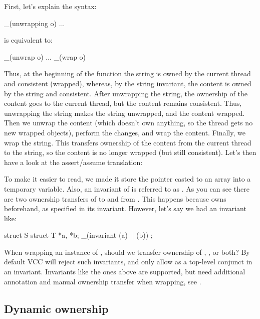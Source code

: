 
\noindent
First, let's explain the syntax:
\begin{VCC}
_(unwrapping o) { ... }
\end{VCC}
is equivalent to:
\begin{VCC}
_(unwrap o) { ... } _(wrap o)
\end{VCC}
Thus, at the beginning of the function the string is owned by the current thread and consistent (\ie wrapped),
whereas, by the string invariant, the content is owned by the string and consistent.
After unwrapping the string, the ownership of the content goes to the current thread,
but the content remains consistent.
Thus, unwrapping the string makes the string unwrapped, and the content wrapped.
Then we unwrap the content (which doesn't own anything, so the thread gets no new wrapped objects), perform the changes,
and wrap the content.
Finally, we wrap the string.
This transfers ownership of the content from the current thread to the string, so the content is no longer wrapped (but still consistent).
Let's then have a look at the assert/assume translation:


\noindent
To make it easier to read, we made it store the  pointer
casted to an array into a temporary variable.
Also, an invariant of  is referred to as .
As you can see there are two ownership transfers
of  to and from \vcc{\me}.
This happens because  owns  beforehand,
as specified in its invariant.
However, let's say we had an invariant like:
\begin{VCC}
struct S {
  struct T *a, *b;
  _(invariant \mine(a) || \mine(b))
};
\end{VCC}
When wrapping an instance of , should we transfer ownership of , , or both?
By default VCC will reject such invariants, and only allow 
as a top-level conjunct in an invariant.
Invariants like the ones above are supported, but need additional annotation
and manual ownership transfer when wrapping, see .



\subsection{Dynamic ownership}
\label{sect:dynamic-ownership}

